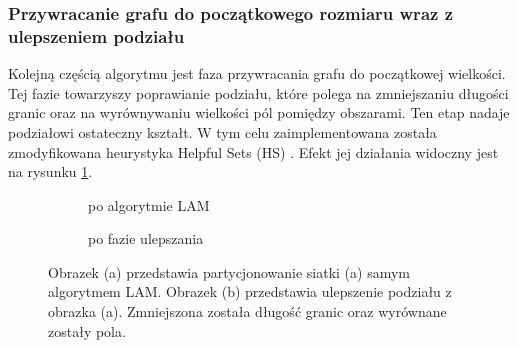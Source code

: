 \subsubsection{Przywracanie grafu do początkowego rozmiaru wraz z ulepszeniem podziału}

Kolejną częścią algorytmu jest faza przywracania grafu do początkowej wielkości.
Tej fazie towarzyszy poprawianie podziału, które polega na zmniejszaniu długości granic oraz na
wyrównywaniu wielkości pól pomiędzy obszarami.
Ten etap nadaje podziałowi ostateczny kształt.
W tym celu zaimplementowana została zmodyfikowana heurystyka Helpful Sets (HS) \cite{10.1007/3-540-44842-X_6}.
Efekt jej działania widoczny jest na rysunku \ref{im:refinement}.
\vspace{2mm}
\begin{figure}[h]
\centering
\begin{subfigure}{.5\textwidth}
    \centering
    \caption[short]{po algorytmie LAM}
\end{subfigure}%
\begin{subfigure}{.5\textwidth}
    \centering
    \caption[short]{po fazie ulepszania}
\end{subfigure}
\caption{Obrazek (a) przedstawia partycjonowanie siatki (a) samym algorytmem LAM.
Obrazek (b) przedstawia ulepszenie podziału z obrazka (a). Zmniejszona została długość granic oraz wyrównane zostały pola.}
\label{im:refinement}
\end{figure}


